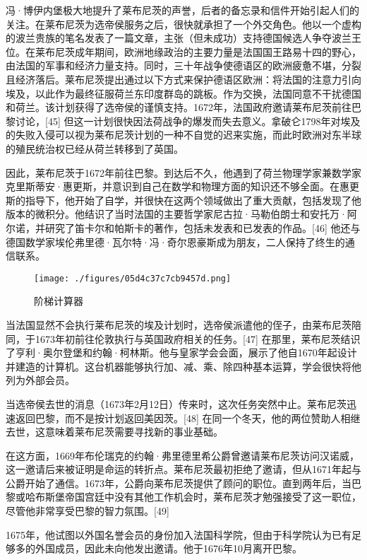 冯·博伊内堡极大地提升了莱布尼茨的声誉，后者的备忘录和信件开始引起人们的关注。在莱布尼茨为选帝侯服务之后，很快就承担了一个外交角色。他以一个虚构的波兰贵族的笔名发表了一篇文章，主张（但未成功）支持德国候选人争夺波兰王位。在莱布尼茨成年期间，欧洲地缘政治的主要力量是法国国王路易十四的野心，由法国的军事和经济力量支持。同时，三十年战争使德语区的欧洲疲惫不堪，分裂且经济落后。莱布尼茨提出通过以下方式来保护德语区欧洲：将法国的注意力引向埃及，以此作为最终征服荷兰东印度群岛的跳板。作为交换，法国同意不干扰德国和荷兰。该计划获得了选帝侯的谨慎支持。1672年，法国政府邀请莱布尼茨前往巴黎讨论，[45] 但这一计划很快因法荷战争的爆发而失去意义。拿破仑1798年对埃及的失败入侵可以视为莱布尼茨计划的一种不自觉的迟来实施，而此时欧洲对东半球的殖民统治权已经从荷兰转移到了英国。

因此，莱布尼茨于1672年前往巴黎。到达后不久，他遇到了荷兰物理学家兼数学家克里斯蒂安·惠更斯，并意识到自己在数学和物理方面的知识还不够全面。在惠更斯的指导下，他开始了自学，并很快在这两个领域做出了重大贡献，包括发现了他版本的微积分。他结识了当时法国的主要哲学家尼古拉·马勒伯朗士和安托万·阿尔诺，并研究了笛卡尔和帕斯卡的著作，包括未发表和已发表的作品。[46] 他还与德国数学家埃伦弗里德·瓦尔特·冯·奇尔恩豪斯成为朋友，二人保持了终生的通信联系。
\begin{figure}[ht]
\centering
\texttt{[image: ./figures/05d4c37c7cb9457d.png]}
\caption{阶梯计算器} \label{fig_LBNC_2}
\end{figure}
当法国显然不会执行莱布尼茨的埃及计划时，选帝侯派遣他的侄子，由莱布尼茨陪同，于1673年初前往伦敦执行与英国政府相关的任务。[47] 在那里，莱布尼茨结识了亨利·奥尔登堡和约翰·柯林斯。他与皇家学会会面，展示了他自1670年起设计并建造的计算机。这台机器能够执行加、减、乘、除四种基本运算，学会很快将他列为外部会员。

当选帝侯去世的消息（1673年2月12日）传来时，这次任务突然中止。莱布尼茨迅速返回巴黎，而不是按计划返回美因茨。[48] 在同一个冬天，他的两位赞助人相继去世，这意味着莱布尼茨需要寻找新的事业基础。

在这方面，1669年布伦瑞克的约翰·弗里德里希公爵曾邀请莱布尼茨访问汉诺威，这一邀请后来被证明是命运的转折点。莱布尼茨最初拒绝了邀请，但从1671年起与公爵开始了通信。1673年，公爵向莱布尼茨提供了顾问的职位。直到两年后，当巴黎或哈布斯堡帝国宫廷中没有其他工作机会时，莱布尼茨才勉强接受了这一职位，尽管他非常享受巴黎的智力氛围。[49]

1675年，他试图以外国名誉会员的身份加入法国科学院，但由于科学院认为已有足够多的外国成员，因此未向他发出邀请。他于1676年10月离开巴黎。
